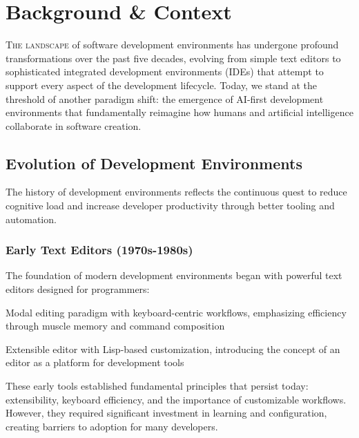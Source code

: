 
\section{Background \& Context}
\label{sec:background-context}

\lettrine{T}{he landscape} of software development environments has undergone profound transformations over the past five decades, evolving from simple text editors to sophisticated integrated development environments (IDEs) that attempt to support every aspect of the development lifecycle. Today, we stand at the threshold of another paradigm shift: the emergence of AI-first development environments that fundamentally reimagine how humans and artificial intelligence collaborate in software creation.

\subsection{Evolution of Development Environments}
\label{subsec:evolution-dev-environments}

The history of development environments reflects the continuous quest to reduce cognitive load and increase developer productivity through better tooling and automation.

\subsubsection{Early Text Editors (1970s-1980s)}

The foundation of modern development environments began with powerful text editors designed for programmers:

\begin{description}[leftmargin=3cm,labelwidth=2.5cm]
    \item[\textbf{vi/Vim}] Modal editing paradigm with keyboard-centric workflows, emphasizing efficiency through muscle memory and command composition
    \item[\textbf{Emacs}] Extensible editor with Lisp-based customization, introducing the concept of an editor as a platform for development tools
\end{description}

These early tools established fundamental principles that persist today: extensibility, keyboard efficiency, and the importance of customizable workflows. However, they required significant investment in learning and configuration, creating barriers to adoption for many developers.

